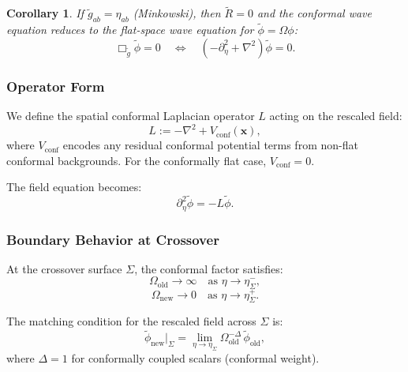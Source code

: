 \documentclass[11pt,a4paper]{article}
\newcommand{\conf}{\Omega}
\newcommand{\laptg}{\Box_{\tilde{g}}}
\newcommand{\Riccit}{\tilde{R}}
\newcommand{\vecx}{\bm{x}}
\theoremstyle{plain}
\newtheorem{corollary}[theorem]{Corollary}
\theoremstyle{definition}
\theoremstyle{remark}
\begin{document}
\begin{corollary}
If $\tilde{g}_{ab} = \eta_{ab}$ (Minkowski), then $\Riccit = 0$ and the conformal wave equation reduces to the flat-space wave equation for $\tilde{\phi} = \conf\phi$:
\begin{equation}
    \laptg \tilde{\phi} = 0 \quad \Leftrightarrow \quad \left(-\partial_\eta^2 + \nabla^2\right)\tilde{\phi} = 0.
\end{equation}
\end{corollary}

\subsubsection{Operator Form}

We define the spatial conformal Laplacian operator $L$ acting on the rescaled field:
\begin{equation}\label{eq:L_operator}
    L := -\nabla^2 + V_{\text{conf}}(\vecx),
\end{equation}
where $V_{\text{conf}}$ encodes any residual conformal potential terms from non-flat conformal backgrounds. For the conformally flat case, $V_{\text{conf}} = 0$.

The field equation becomes:
\begin{equation}\label{eq:field_eq_operator}
    \partial_\eta^2 \tilde{\phi} = -L\tilde{\phi}.
\end{equation}

\subsubsection{Boundary Behavior at Crossover}

At the crossover surface $\Sigma$, the conformal factor satisfies:
\begin{equation}
    \conf_{\text{old}} \to \infty \quad \text{as } \eta \to \eta_\Sigma^-,
\end{equation}
\begin{equation}
    \conf_{\text{new}} \to 0 \quad \text{as } \eta \to \eta_\Sigma^+.
\end{equation}

The matching condition for the rescaled field across $\Sigma$ is:
\begin{equation}\label{eq:crossover_matching}
    \tilde{\phi}_{\text{new}}\big|_{\Sigma} = \lim_{\eta \to \eta_\Sigma} \conf_{\text{old}}^{-\Delta}\, \tilde{\phi}_{\text{old}},
\end{equation}
where $\Delta = 1$ for conformally coupled scalars (conformal weight).
\end{document}
